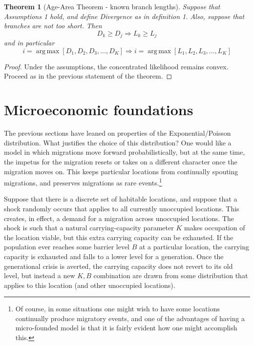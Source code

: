 \documentclass[11pt]{article}
\newtheorem{theorem}{Theorem}
\DeclareMathOperator*{\argmax}{arg\,max}
\begin{document}
{\begin{theorem}[Age-Area Theorem  - known branch lengths]
Suppose that Assumptions 1 hold, and define Divergence as in definition 1. Also, suppose that branches are not too short.  Then  
\begin{equation*}
D_k \geq D_j \Longrightarrow L_k\geq L_j
\end{equation*}
and in particular
\begin{equation*}
i=\argmax\left[D_1,D_2,D_3,\hdots,D_{K}\right] \Longrightarrow i=\argmax\left[L_1,L_2,L_3,\hdots,L_K\right]
\end{equation*}
\end{theorem}

\begin{proof}
Under the assumptions, the concentrated likelihood remains convex. Proceed as in the previous statement of the theorem.
\end{proof}

\section{Microeconomic foundations}

The previous sections have leaned on properties of the Exponential/Poisson distribution. What justifies the choice of this distribution? One would like a model in which migrations move forward probabilistically, but at the same time, the impetus for the migration resets or takes on a different character once the migration moves on. This keeps particular locations from continually spouting migrations, and preserves migrations as rare events.\footnote{Of course, in some situations one might wish to have some locations continually produce migratory events, and one of the advantages of having a micro-founded model is that it is fairly evident how one might accomplish this.}

Suppose that there is a discrete set of habitable locations, and suppose that a shock randomly occurs that applies to all currently unoccupied locations. This creates, in effect, a demand for a migration across unoccupied locations. The shock is such that a natural carrying-capacity parameter $K$ makes occupation of the location viable, but this extra carrying capacity can be exhausted. If the population ever reaches some barrier level $B$ at a particular location, the carrying capacity is exhausted and falls to a lower level for a generation. Once the generational crisis is averted, the carrying capacity does not revert to its old level, but instead a new $K,B$ combination are drawn from some distribution that applies to this location (and other unoccupied locations).  

}
\end{document}
